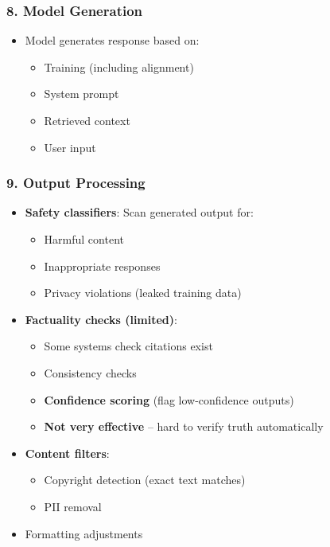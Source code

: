 \subsubsection{8. Model Generation}
\begin{itemize}[leftmargin=*]
    \item Model generates response based on:
    \begin{itemize}
        \item Training (including alignment)
        \item System prompt
        \item Retrieved context
        \item User input
    \end{itemize}
\end{itemize}

\subsubsection{9. Output Processing }
\begin{itemize}[leftmargin=*]
    \item \textbf{Safety classifiers}: Scan generated output for:
    \begin{itemize}
        \item Harmful content
        \item Inappropriate responses
        \item Privacy violations (leaked training data)
    \end{itemize}
    \item \textbf{Factuality checks {} (limited)}:
    \begin{itemize}
        \item Some systems check citations exist
        \item Consistency checks
        \item \textbf{Confidence scoring} (flag low-confidence outputs)
        \item \textbf{Not very effective} -- hard to verify truth automatically
    \end{itemize}
    \item \textbf{Content filters}:
    \begin{itemize}
        \item Copyright detection (exact text matches)
        \item PII removal
    \end{itemize}
    \item Formatting adjustments
\end{itemize}

